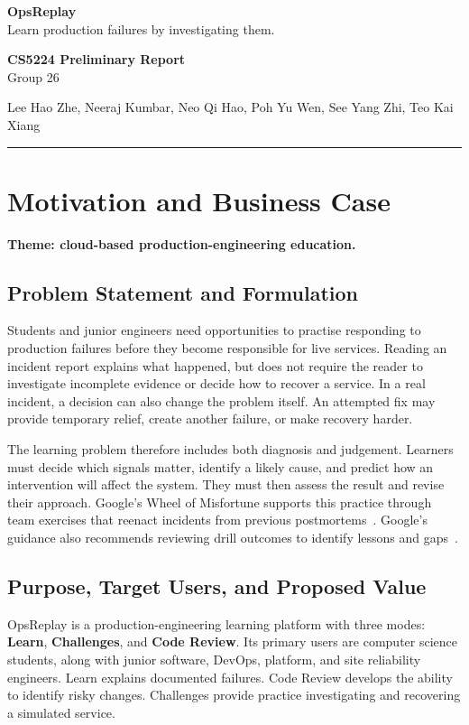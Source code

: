 \documentclass[11pt,a4paper]{article}
\newcommand{\Group}{Group 26}
\newcommand{\Members}{Lee Hao Zhe, Neeraj Kumbar, Neo Qi Hao, Poh Yu Wen, See Yang Zhi, Teo Kai Xiang}
\begin{document}
\noindent
\begin{minipage}[t]{0.60\linewidth}
  \raggedright
  {\LARGE\bfseries OpsReplay}\\[3pt]
  {\small Learn production failures by investigating them.}
\end{minipage}\hfill
\begin{minipage}[t]{0.38\linewidth}
  \raggedleft\small
  \textbf{CS5224 Preliminary Report}\\[2pt]
  \Group
\end{minipage}
\par\vspace{5pt}
{\footnotesize\Members\par}
\vspace{2pt}\hrule\vspace{4pt}

\section{Motivation and Business Case}
\textbf{Theme: cloud-based production-engineering education.}

\subsection{Problem Statement and Formulation}
Students and junior engineers need opportunities to practise responding to
production failures before they become responsible for live services.
Reading an incident report explains what happened, but does not require
the reader to investigate incomplete evidence or decide how to recover a
service. In a real incident, a decision can also change the problem itself.
An attempted fix may provide temporary relief, create another failure, or
make recovery harder.

The learning problem therefore includes both diagnosis and judgement.
Learners must decide which signals matter, identify a likely cause, and
predict how an intervention will affect the system. They must then assess
the result and revise their approach. Google's Wheel of Misfortune supports
this practice through team exercises that reenact incidents from previous
postmortems~\cite{sre-postmortem}. Google's guidance also recommends reviewing
drill outcomes to identify lessons and gaps~\cite{sre-response}.

\subsection{Purpose, Target Users, and Proposed Value}
OpsReplay is a production-engineering learning platform with three modes:
\textbf{Learn}, \textbf{Challenges}, and \textbf{Code Review}. Its primary
users are computer science students, along with junior
software, DevOps, platform, and site reliability engineers. Learn explains
documented failures. Code Review develops the ability to identify risky
changes. Challenges provide practice investigating and recovering a
simulated service.
\end{document}
